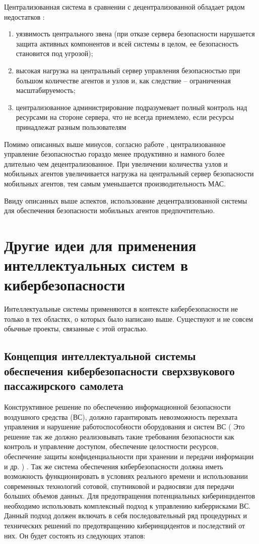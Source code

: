 Централизованная система в сравнении с децентрализованной обладает рядом недостатков \cite{probs}: %
\begin{enumerate}
    \item уязвимость центрального звена (при отказе сервера безопасности
    нарушается защита активных компонентов и всей системы в целом, ее безопасность становится под угрозой);
    \item высокая нагрузка на центральный сервер управления безопасностью при большом количестве агентов
    и узлов и, как следствие – ограниченная масштабируемость;
    \item централизованное администрирование подразумевает полный контроль над ресурсами на стороне сервера,
    что не всегда приемлемо, если ресурсы принадлежат разным пользователям
\end{enumerate}

Помимо описанных выше минусов, согласно работе \cite{mob}, централизованное управление безопасностью
гораздо менее продуктивно и намного более длительно чем децентрализованное. При увеличении количества
узлов и мобильных агентов увеличивается нагрузка на центральный
сервер безопасности мобильных агентов, тем самым уменьшается производительность МАС.

Ввиду описанных выше аспектов, использование децентрализованной системы для обеспечения
безопасности мобильных агентов предпочтительно.

\section{Другие идеи для применения интеллектуальных систем в кибербезопасности}
Интеллектуальные системы применяются в контексте кибербезопасности не только в тех областях, о которых было
написано выше. Существуют и не совсем обычные проекты, связанные с этой отраслью.

\subsection{Концепция интеллектуальной системы обеспечения кибербезопасности сверхзвукового
пассажирского самолета}
Конструктивное решение по обеспечению информационной безопасности воздушного средства (ВС), должно гарантировать
невозможность перехвата управления и нарушение работоспособности оборудования и систем ВС (
Это решение так же должно реализовывать такие требования безопасности как контроль и управление доступом,
обеспечение целостности ресурсов, обеспечение защиты конфиденциальности при хранении и передачи информации
и др.
) \cite{concept}. Так же система обеспечения кибербезопасности должна иметь возможность функционировать в
условиях реального времени и использовании современных технологий сотовой, спутниковой и
радиосвязи для передачи больших объемов данных.
Для предотвращения потенциальных киберинцидентов необходимо использовать комплексный подход
к управлению киберрисками ВС. Данный подход должен включать в себя последовательный ряд процедурных
и технических решений по предотвращению киберинцидентов и последствий от них.
Он будет состоять из следующих этапов:

